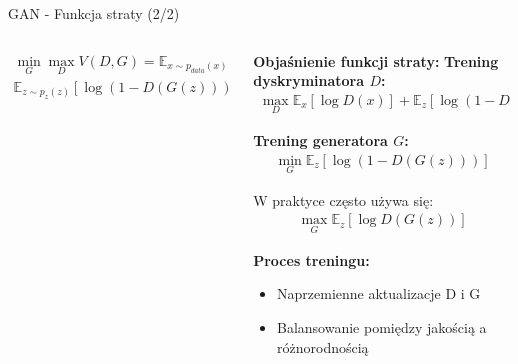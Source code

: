 \documentclass{beamer}
\begin{document}
\begin{frame}{GAN - Funkcja straty (2/2)}
  \begin{columns}
    \begin{column}{0.5\textwidth}
      \begin{tcolorbox}[colback=yellow!10!white, colframe=black!60, boxrule=0.5pt, arc=3mm]
        \begin{align*}
          \min_G \max_D V(D,G) = \mathbb{E}_{x \sim p_{data}(x)}[\log D(x)] + \\
          \mathbb{E}_{z \sim p_z(z)}[\log(1 - D(G(z)))]
        \end{align*}
      \end{tcolorbox}
    \end{column}
    \begin{column}{0.5\textwidth}
      \textbf{Objaśnienie funkcji straty:}
      \medskip
      \textbf{Trening dyskryminatora $D$:} 
      \begin{align*}
        \max_D \mathbb{E}_{x}[\log D(x)] + \mathbb{E}_{z}[\log(1 - D(G(z)))]
      \end{align*}
      
      \textbf{Trening generatora $G$:} 
      \begin{align*}
        \min_G \mathbb{E}_{z}[\log(1 - D(G(z)))]
      \end{align*}
      
      W praktyce często używa się:
      \begin{align*}
        \max_G \mathbb{E}_{z}[\log D(G(z))]
      \end{align*}
      
      \medskip
      \textbf{Proces treningu:}
      \begin{itemize}
        \item Naprzemienne aktualizacje D i G
        \item Balansowanie pomiędzy jakością a różnorodnością
      \end{itemize}
    \end{column}
  \end{columns}
\end{frame}
\end{document}
